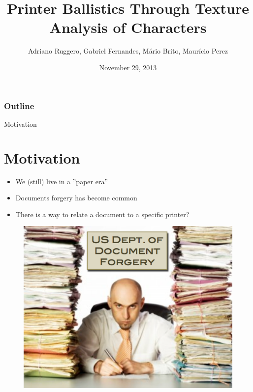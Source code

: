 \documentclass[notes]{beamer}
\title{Printer Ballistics Through Texture Analysis of Characters}
\subtitle{}
\institute{Institute of Computing - Unicamp}
\date{November 29, 2013}
\author{Adriano Ruggero, Gabriel Fernandes, Mário Brito, Maurício Perez}
\begin{document}
\begin{frame}
  \titlepage
\end{frame}

\begin{frame}
  \frametitle{Outline}
  \tableofcontents
\end{frame}

\begin{frame}

\begin{block}{Motivation}
\section{Motivation}
\begin{itemize}

\item We (still) live in a ''paper era''

\item Documents forgery has become common

\item There is a way to relate a document to a specific printer?

\end{itemize}

\end{block}


\begin{figure}[!htb]
\centering
\includegraphics[scale=0.35]{forgery}
\label{fig:forgery}
\end{figure}

\end{frame}
\end{document}
